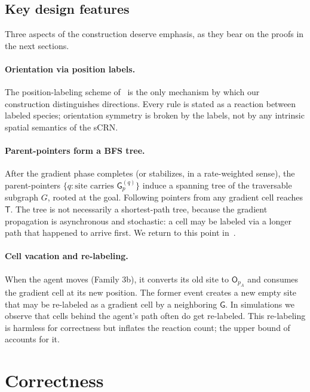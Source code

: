 \documentclass[11pt]{article}
\theoremstyle{plain}
\theoremstyle{definition}
\theoremstyle{remark}
\begin{document}
\subsection{Key design features}
\label{subsec:design}

Three aspects of the construction deserve emphasis, as they bear on the proofs in the next sections.

\paragraph{Orientation via position labels.} The position-labeling scheme of~ is the only mechanism by which our construction distinguishes directions. Every rule is stated as a reaction between labeled species; orientation symmetry is broken by the labels, not by any intrinsic spatial semantics of the sCRN.

\paragraph{Parent-pointers form a BFS tree.} After the gradient phase completes (or stabilizes, in a rate-weighted sense), the parent-pointers $\{q : \text{site carries } \mathsf{G}^{(q)}_p\}$ induce a spanning tree of the traversable subgraph $G$, rooted at the goal. Following pointers from any gradient cell reaches $\mathsf{T}$. The tree is not necessarily a shortest-path tree, because the gradient propagation is asynchronous and stochastic: a cell may be labeled via a longer path that happened to arrive first. We return to this point in~.

\paragraph{Cell vacation and re-labeling.} When the agent moves (Family 3b), it converts its old site to $\mathsf{O}_{p_A}$ and consumes the gradient cell at its new position. The former event creates a new empty site that may be re-labeled as a gradient cell by a neighboring $\mathsf{G}$. In simulations we observe that cells behind the agent's path often do get re-labeled. This re-labeling is harmless for correctness but inflates the reaction count; the upper bound of~ accounts for it.



\section{Correctness}
\label{sec:correctness}
\end{document}

